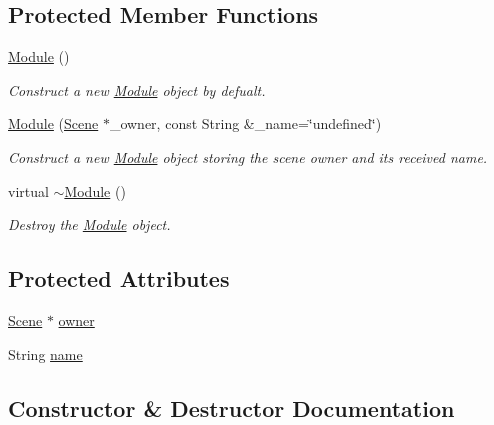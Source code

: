 \subsection*{Protected Member Functions}
\begin{DoxyCompactItemize}
\item 
\mbox{\hyperlink{classbanita_1_1_module_a7d70379d14dcf081cd9370224a5d5fda}{Module}} ()
\begin{DoxyCompactList}\small\item\em Construct a new \mbox{\hyperlink{classbanita_1_1_module}{Module}} object by defualt. \end{DoxyCompactList}\item 
\mbox{\hyperlink{classbanita_1_1_module_a5432095b67b68582d293af3a2c106a73}{Module}} (\mbox{\hyperlink{classbanita_1_1_scene}{Scene}} $\ast$\+\_\+owner, const String \&\+\_\+name=\char`\"{}undefined\char`\"{})
\begin{DoxyCompactList}\small\item\em Construct a new \mbox{\hyperlink{classbanita_1_1_module}{Module}} object storing the scene owner and it\textquotesingle{}s received name. \end{DoxyCompactList}\item 
virtual \mbox{\hyperlink{classbanita_1_1_module_a54299f4573f04a87251805de43f3f3b4}{$\sim$\+Module}} ()
\begin{DoxyCompactList}\small\item\em Destroy the \mbox{\hyperlink{classbanita_1_1_module}{Module}} object. \end{DoxyCompactList}\end{DoxyCompactItemize}
\subsection*{Protected Attributes}
\begin{DoxyCompactItemize}
\item 
\mbox{\hyperlink{classbanita_1_1_scene}{Scene}} $\ast$ \mbox{\hyperlink{classbanita_1_1_module_a10a833e8e5e1d2fb732f1aacaea32f30}{owner}}
\item 
String \mbox{\hyperlink{classbanita_1_1_module_a7295535148079c57f3ab6b4e77908cc5}{name}}
\end{DoxyCompactItemize}


\subsection{Constructor \& Destructor Documentation}
\mbox{\label{classbanita_1_1_module_a7d70379d14dcf081cd9370224a5d5fda}} 
